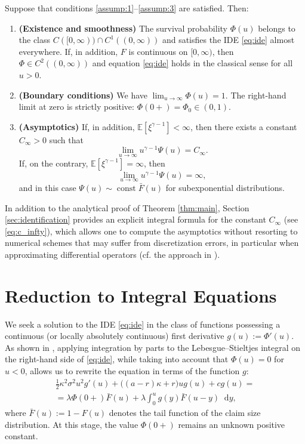 \documentclass[smallextended]{svjour3}
\providecommand{\diff}{\mathop{}\!\mathrm{d}}
\begin{document}
\begin{theorem}\label{thm:main}
Suppose that conditions \ref{assump:1}--\ref{assump:3} are satisfied. Then:
\begin{enumerate}[label=(\roman*)]
    \item \textbf{(Existence and smoothness)} The survival probability $\Phi(u)$ belongs to the class $C([0,\infty)) \cap C^1((0,\infty))$ and satisfies the IDE \eqref{eq:ide} almost everywhere. If, in addition, $F$ is continuous on $[0,\infty)$, then $\Phi \in C^2((0,\infty))$ and equation \eqref{eq:ide} holds in the classical sense for all $u > 0$.
    
    \item \textbf{(Boundary conditions)} We have $\lim_{u\to\infty} \Phi(u) = 1$. The right-hand limit at zero is strictly positive: $\Phi(0+) = \Phi_0 \in (0,1)$.

    \item \textbf{(Asymptotics)} If, in addition, $\mathbb{E}[\xi^{\gamma-1}]<\infty$, then there exists a constant $C_\infty>0$ such that  
    \[
    \lim_{u\to\infty} u^{\gamma-1}\Psi(u) = C_\infty.
    \]  
    If, on the contrary, $\mathbb{E}[\xi^{\gamma-1}]=\infty$, then  
    \[
    \lim_{u\to\infty} u^{\gamma-1}\Psi(u) = \infty,
    \]
    and in this case $\Psi(u) \sim \operatorname{const} \bar F(u)$ for subexponential distributions.
\end{enumerate}
\end{theorem}

In addition to the analytical proof of Theorem \ref{thm:main}, Section \ref{sec:identification} provides an explicit integral formula for the constant $C_\infty$ (see \eqref{eq:c_infty}), which allows one to compute the asymptotics without resorting to numerical schemes that may suffer from discretization errors, in particular when approximating differential operators (cf. the approach in \cite{AK2026}).

\section{Reduction to Integral Equations}

We seek a solution to the IDE \eqref{eq:ide} in the class of functions possessing a continuous (or locally absolutely continuous) first derivative $g(u) := \Phi'(u)$. As shown in \cite[Section 3]{Grandits2004}, applying integration by parts to the Lebesgue--Stieltjes integral on the right-hand side of \eqref{eq:ide}, while taking into account that $\Phi(u)=0$ for $u<0$, allows us to rewrite the equation in terms of the function $g$:
\begin{multline}
\label{eq:ide_g_raw}
\frac{1}{2} \kappa^2 \sigma^2 u^2 g'(u) + \big( (a-r)\kappa + r \big) u g(u) + c g(u) =
\\
= \lambda \Phi(0+) \bar{F}(u) + \lambda \int_0^u g(y) \bar{F}(u-y) \diff y,
\end{multline}
where $\bar{F}(u) := 1 - F(u)$ denotes the tail function of the claim size distribution. At this stage, the value $\Phi(0+)$ remains an unknown positive constant.
\end{document}
